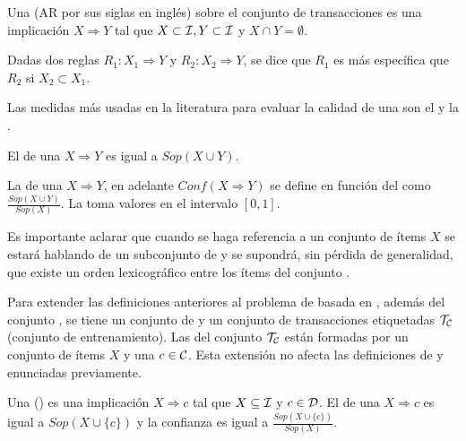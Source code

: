 \begin{Definition}[\AR]
  Una \AR (AR por sus siglas en inglés) sobre el conjunto de transacciones \T es una implicación $X\Rightarrow Y$ tal que $X\subset\I, Y\subset\I$ y $X\cap Y=\emptyset$.
\label{def:reglas-de-asociacion}
\end{Definition}

\begin{Definition}[Especificidad]
  Dadas dos reglas $R_1: X_1\Rightarrow Y$ y $R_2: X_2\Rightarrow Y$, se dice que $R_1$ es más específica que $R_2$ si $X_2\subset X_1$.
\label{def:especificidad}
\end{Definition}

Las medidas más usadas en la literatura para evaluar la calidad de una \AR son el \soporte y la \confianza.

\begin{Definition}
  El \soporte de una \ar $X\Rightarrow Y$ es igual a $Sop(X\cup Y)$.
\label{def:soporte-de-una-AR}
\end{Definition}

\begin{Definition}
  La \confianza de una \ar $X\Rightarrow Y$, en adelante $Conf(X\Rightarrow Y)$ se define en función del \soporte como $\frac{Sop(X\cup Y)}{Sop(X)}$. La \confianza toma valores en el intervalo $[0,1]$.
\label{def:confianza-de-una-AR}
\end{Definition}

Es importante aclarar que cuando se haga referencia a un conjunto de ítems $X$ se estará hablando de un subconjunto de \I y se supondrá, sin pérdida de generalidad, que existe un orden lexicográfico entre los ítems del conjunto \I.

Para extender las definiciones anteriores al problema de \clasificacion basada en \sCARs, además del conjunto \I, se tiene un conjunto de \clases \C y un conjunto de transacciones etiquetadas $\T_\C$ (conjunto de entrenamiento). Las \transacciones del conjunto $\T_\C$ están formadas por un conjunto de ítems $X$ y una \clase $c\in \C$. Esta extensión no afecta las definiciones de \soporte y \confianza enunciadas previamente.

\begin{Definition}[\CAR]
  Una \CAR (\sCAR) es una implicación $X\Rightarrow c$ tal que $X\subseteq\I$ y $c\in\D$. El \soporte de una \CAR $X\Rightarrow c$ es igual a $Sop(X\cup\{c\})$ y la confianza es igual a $\frac{Sop(X\cup\{c\})}{Sop(X)}$.
\label{def:CAR}
\end{Definition}

